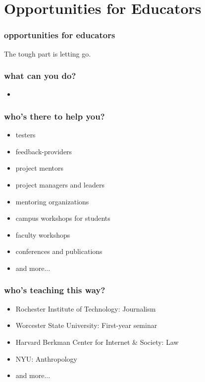 \section{Opportunities for Educators}
\begin{comment}
* What can you do?
**  Who's there to help you?
** Who's working on this?
\end{comment}


\begin{frame} 
\frametitle{opportunities for educators}
\huge
\begin{center}
The tough part is \alert{letting go}.
\end{center}
\end{frame} 




\begin{frame} 
\frametitle{what can you do?}
\begin{itemize}
	\item %
\end{itemize}

\end{frame} 



\begin{frame} 
\frametitle{who's there to help you?}
\begin{itemize}
	\item testers
	\item feedback-providers
	\item project mentors
	\item project managers and leaders
	\item mentoring organizations
	\item campus workshops for students
	\item faculty workshops
	\item conferences and publications
	\item and more...
\end{itemize}

\end{frame} 



\begin{frame} 
\frametitle{who's teaching this way?}
\begin{itemize}
	\item Rochester Institute of Technology: Journalism
	\item Worcester State University: First-year seminar
	\item Harvard Berkman Center for Internet \& Society: Law
	\item NYU: Anthropology
	\item and more...
\end{itemize}

\end{frame}

